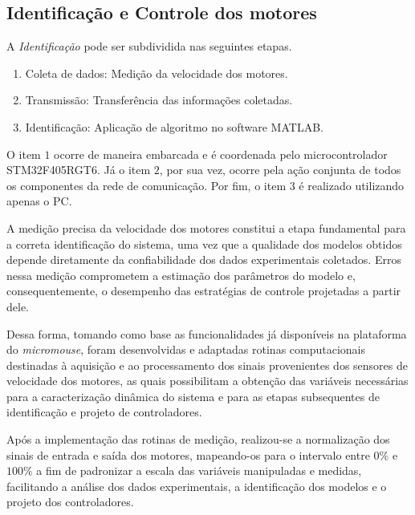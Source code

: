         \subsection{Identificação e Controle dos motores} \label{ssec:controle-motores}
            
            A \textit{Identificação} pode ser subdividida nas seguintes etapas. 
            
            \begin{enumerate}
                \item Coleta de dados: Medição da velocidade dos motores.
                \item Transmissão: Transferência das informações coletadas.
                \item Identificação: Aplicação de algoritmo no software MATLAB.
            \end{enumerate}
            
            O item $1$ ocorre de maneira embarcada e é coordenada pelo microcontrolador STM32F405RGT6. Já o item $2$, por sua vez, ocorre pela ação conjunta de todos os componentes da rede de comunicação. Por fim, o item $3$ é realizado utilizando apenas o \gls{PC}.

            A medição precisa da velocidade dos motores constitui a etapa fundamental para a correta identificação do sistema, uma vez que a qualidade dos modelos obtidos depende diretamente da confiabilidade dos dados experimentais coletados. Erros nessa medição comprometem a estimação dos parâmetros do modelo e, consequentemente, o desempenho das estratégias de controle projetadas a partir dele.

            Dessa forma, tomando como base as funcionalidades já disponíveis na plataforma do \textit{micromouse}, foram desenvolvidas e adaptadas rotinas computacionais destinadas à aquisição e ao processamento dos sinais provenientes dos sensores de velocidade dos motores, as quais possibilitam a obtenção das variáveis necessárias para a caracterização dinâmica do sistema e para as etapas subsequentes de identificação e projeto de controladores. 

            Após a implementação das rotinas de medição, realizou-se a normalização dos sinais de entrada e saída dos motores, mapeando-os para o intervalo entre $0\%$ e $100\%$ a fim de padronizar a escala das variáveis manipuladas e medidas, facilitando a análise dos dados experimentais, a identificação dos modelos e o projeto dos controladores. 
            
